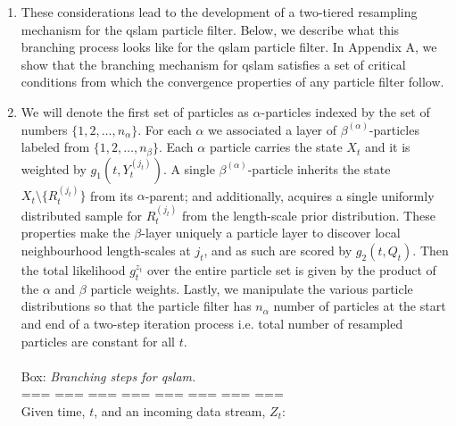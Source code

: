 \begin{enumerate}
	\item These considerations lead to the development of a two-tiered resampling mechanism for the qslam particle filter. Below, we describe what this branching process looks like for the qslam particle filter. In Appendix A, we show that the branching mechanism for qslam satisfies a set of critical conditions from which the convergence properties of any particle filter follow. 
\item We will denote  the first set of particles as $\alpha$-particles indexed by the set of numbers $\{1, 2, \hdots, n_\alpha\}$. For each $\alpha$ we associated a layer of $\beta^{(\alpha)}$-particles labeled from $\{1, 2, \hdots, n_\beta \}$. Each  $\alpha$ particle carries the state $X_t$ and it is weighted by $ g_1(t, Y_t^{(j_t)})$. A single $\beta^{(\alpha)}$-particle inherits the state $X_t \setminus \{R_t^{(j_t)}\} $ from its $\alpha$-parent; and additionally, acquires a single uniformly distributed sample for $R_t^{(j_t)}$ from the length-scale prior distribution. These properties make the $\beta$-layer uniquely a particle layer to discover local neighbourhood length-scales at $j_t$, and as such are scored by  $g_2(t, Q_t)$. Then the total likelihood $g_t^{z_t}$ over the entire particle set is given by the product of the $\alpha$ and $\beta$ particle weights. Lastly, we manipulate the various particle distributions so that the particle filter has $n_\alpha$ number of particles at the start and end of a two-step iteration process i.e. total number of resampled particles are constant for all $t$.\\
\\
Box: \textit{Branching steps for qslam.} \\
=== === === === === === === === \\
Given time, $t$, and an incoming data stream, $Z_t$:
\end{enumerate}
